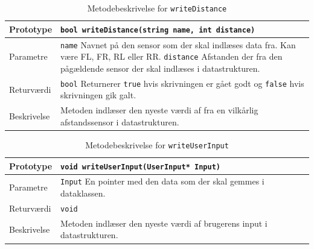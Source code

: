 \begin{table}
\begin{tabularx}{\textwidth}{| L{2.5 cm} | Z |} \hline
Prototype & \texttt{bool  writeDistance(string name, int distance)} \\\hline
Parametre & \texttt{name} \newline Navnet på den sensor som der skal indlæses data fra. Kan være FL, FR, RL eller RR. \newline \newline
			\texttt{distance} \newline
			Afstanden der fra den pågældende sensor der skal indlæses i datastrukturen.\\\hline
Returværdi &  \texttt{bool} \newline Returnerer \texttt{true} hvis skrivningen er gået godt og \texttt{false} hvis skrivningen gik galt. \\\hline
Beskrivelse & Metoden indlæser den nyeste værdi af fra en vilkårlig afstandssensor i datastrukturen. \\\hline
\end{tabularx}
\caption{Metodebeskrivelse for \texttt{writeDistance}}
\label{table:met_writeDistance}
\end{table}

\begin{table}
\begin{tabularx}{\textwidth}{| L{2.5 cm} | Z |} \hline
Prototype & \texttt{void writeUserInput(UserInput* Input)} \\\hline
Parametre & \texttt{Input} \newline En pointer med den data som der skal gemmes i dataklassen. \\\hline
Returværdi &  \texttt{void} \newline \\\hline
Beskrivelse & Metoden indlæser den nyeste værdi af brugerens input i datastrukturen. \\\hline
\end{tabularx}
\caption{Metodebeskrivelse for \texttt{writeUserInput}}
\label{table:met_writeUserInput}
\end{table}


